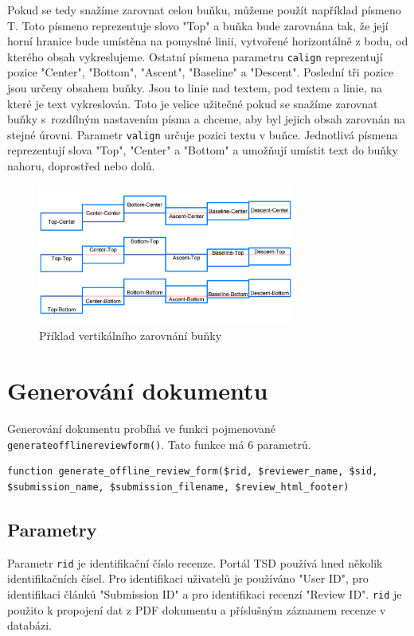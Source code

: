 \documentclass[czech,BP]{thesiskiv}
\begin{document}
Pokud se tedy snažíme zarovnat celou buňku, můžeme použít například písmeno T. Toto písmeno reprezentuje slovo "Top" a buňka bude zarovnána tak, že její horní hranice bude umístěna na pomyslné linii, vytvořené horizontálně z bodu, od kterého obsah vykreslujeme. Ostatní písmena parametru \texttt{calign} reprezentují pozice "Center", "Bottom", "Ascent", "Baseline" a "Descent". Poslední tři pozice jsou určeny obsahem buňky. Jsou to linie nad textem, pod textem a linie, na které je text vykreslován. Toto je velice užitečné pokud se snažíme zarovnat buňky s~rozdílným nastavením písma a chceme, aby byl jejich obsah zarovnán na stejné úrovni. Parametr \texttt{valign} určuje pozici textu v buňce. Jednotlivá písmena reprezentují slova "Top", "Center" a "Bottom" a umožňují umístit text do buňky nahoru, doprostřed nebo dolů.
\begin{figure}[h]
    \centering
    \includegraphics[width=0.75\textwidth]{obr1.png}
    \caption{Příklad vertikálního zarovnání buňky}
    \label{zarovnani}
\end{figure}

\section{Generování dokumentu}
\sloppy
Generování dokumentu probíhá ve funkci pojmenované \texttt{generate\textunderscore offline\textunderscore review\textunderscore form()}. Tato funkce má 6 parametrů. 
\label{lst:Generovani}
\begin{lstlisting}
function generate_offline_review_form($rid, $reviewer_name, $sid, $submission_name, $submission_filename, $review_html_footer)
\end{lstlisting}
\subsection{Parametry}
Parametr \texttt{rid} je identifikační číslo recenze. Portál TSD používá hned několik identifikačních čísel. Pro identifikaci uživatelů je používáno "User ID", pro identifikaci článků "Submission ID" a pro identifikaci recenzí "Review ID". \texttt{rid} je použito k propojení dat z PDF dokumentu a příslušným záznamem recenze v databázi. 
\end{document}
